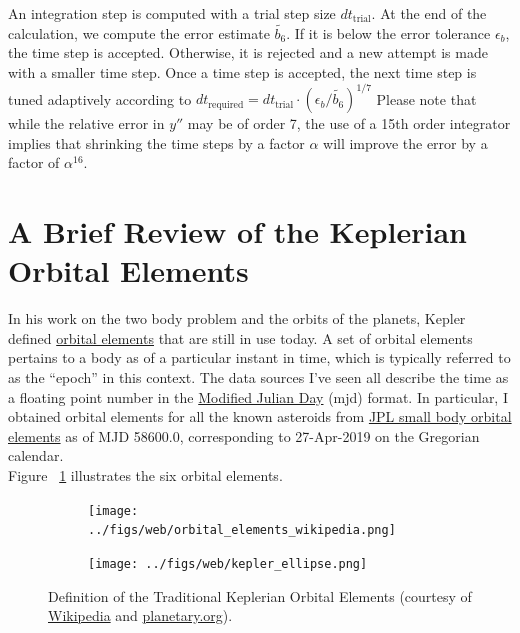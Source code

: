 An integration step is computed with a trial step size $dt_{\text{trial}}$.
At the end of the calculation, we compute the error estimate $\widetilde{b_6}$.
If it is below the error tolerance $\epsilon_b$, the time step is accepted.
Otherwise, it is rejected and a new attempt is made with a smaller time step.
Once a time step is accepted, the next  time step is tuned adaptively according to
$dt_{\text{required}} = dt_{\text{trial}} \cdot \left( \epsilon_b / \widetilde{b_6}\right)^{1/7}$
Please note that while the relative error in $y''$ may be of order 7, 
the use of a 15th order integrator implies that 
shrinking the time steps by a factor $\alpha$ will improve the error by a factor of $\alpha^{16}$.

\section{A Brief Review of the Keplerian Orbital Elements}
\label{section_orbital_elements}
In his work on the two body problem and the orbits of the planets, Kepler defined 
\href{https://en.wikipedia.org/wiki/Orbital_elements}{orbital elements}
that are still in use today.
A set of orbital elements pertains to a body as of a particular instant in time, which is typically referred to as the ``epoch'' in this context.
The data sources I've seen all describe the time as a floating point number in the \href{https://en.wikipedia.org/wiki/Julian_day}{Modified Julian Day} (mjd) format.
In particular, I obtained orbital elements for all the known asteroids from \href{https://ssd.jpl.nasa.gov/?sb_elem}{JPL small body orbital elements}
as of MJD 58600.0, corresponding to 27-Apr-2019 on the Gregorian calendar.\\
Figure ~\ref{fig:KeplerianOrbitalElements} illustrates the six orbital elements.

\begin{figure}[h]
\begin{subfigure}[t]{0.5\textwidth}
\centering
\texttt{[image: ../figs/web/orbital\_elements\_wikipedia.png]}
\end{subfigure}
\hfill
\begin{subfigure}[t]{0.5\textwidth}
\centering
\texttt{[image: ../figs/web/kepler\_ellipse.png]}
\end{subfigure}
\caption[Definition of the Traditional Keplerian Orbital Elements]
{Definition of the Traditional Keplerian Orbital Elements (courtesy of 
\href{https://en.wikipedia.org/wiki/Orbital_elements}{Wikipedia} and
\href{https://www.planetary.org/blogs/emily-lakdawalla/2012/3380.html}{planetary.org}).}
\label{fig:KeplerianOrbitalElements}
\end{figure}


